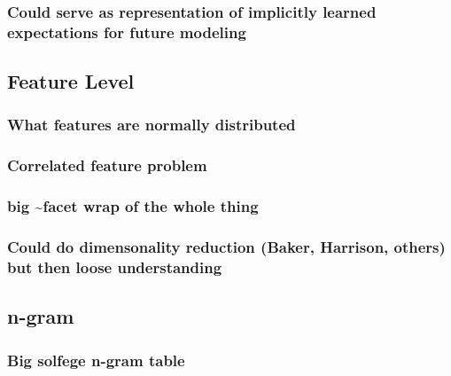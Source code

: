 \documentclass[]{book}
\begin{document}
\hypertarget{could-serve-as-representation-of-implicitly-learned-expectations-for-future-modeling}{%
\subsubsection{Could serve as representation of implicitly learned expectations for future modeling}\label{could-serve-as-representation-of-implicitly-learned-expectations-for-future-modeling}}

\hypertarget{feature-level}{%
\subsection{Feature Level}\label{feature-level}}

\hypertarget{what-features-are-normally-distributed}{%
\subsubsection{What features are normally distributed}\label{what-features-are-normally-distributed}}

\hypertarget{correlated-feature-problem}{%
\subsubsection{Correlated feature problem}\label{correlated-feature-problem}}

\hypertarget{big-facet-wrap-of-the-whole-thing}{%
\subsubsection{big \textasciitilde{}facet wrap of the whole thing}\label{big-facet-wrap-of-the-whole-thing}}

\hypertarget{could-do-dimensonality-reduction-baker-harrison-others-but-then-loose-understanding}{%
\subsubsection{Could do dimensonality reduction (Baker, Harrison, others) but then loose understanding}\label{could-do-dimensonality-reduction-baker-harrison-others-but-then-loose-understanding}}

\hypertarget{n-gram}{%
\subsection{n-gram}\label{n-gram}}

\hypertarget{big-solfege-n-gram-table}{%
\subsubsection{Big solfege n-gram table}\label{big-solfege-n-gram-table}}
\end{document}
